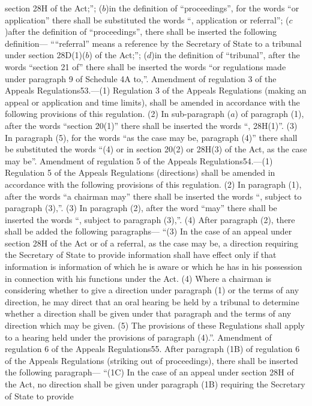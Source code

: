 \documentclass[a4paper]{article}
\begin{document}
section 28H of the Act;”;
($b$)in the definition of “proceedings”, for the words “or application” there
shall be substituted the words “, application or referral”;
($c$)after the definition of “proceedings”, there shall be inserted the following
definition—
““referral” means a reference by the Secretary of State to a tribunal under
section 28D(1)($b$) of the Act;”;
($d$)in the definition of “tribunal”, after the words “section 21 of” there shall
be inserted the words “or regulations made under paragraph 9 of Schedule 4A
to,”.
Amendment of regulation 3 of the Appeals Regulations53.—(1) Regulation 3 of the
Appeals Regulations (making an appeal or application and time limits), shall be
amended in accordance with the following provisions of this regulation.
(2) In sub-paragraph ($a$) of paragraph (1), after the words “section 20(1)” there
shall be inserted the words “, 28H(1)”.
(3) In paragraph (5), for the words “as the case may be, paragraph (4)” there
shall be substituted the words “(4) or in section 20(2) or 28H(3) of the Act, as
the case may be”.
Amendment of regulation 5 of the Appeals Regulations54.—(1) Regulation 5 of the
Appeals Regulations (directions) shall be amended in accordance with the
following provisions of this regulation.
(2) In paragraph (1), after the words “a chairman may” there shall be inserted
the words “, subject to paragraph (3),”.
(3) In paragraph (2), after the word “may” there shall be inserted the words “,
subject to paragraph (3),”.
(4) After paragraph (2), there shall be added the following paragraphs—
“(3) In the case of an appeal under section 28H of the Act or of a referral, as
the case may be, a direction requiring the Secretary of State to provide
information shall have effect only if that information is information of which
he is aware or which he has in his possession in connection with his functions
under the Act.
(4) Where a chairman is considering whether to give a direction under paragraph
(1) or the terms of any direction, he may direct that an oral hearing be held by
a tribunal to determine whether a direction shall be given under that paragraph
and the terms of any direction which may be given.
(5) The provisions of these Regulations shall apply to a hearing held under the
provisions of paragraph (4).”.
Amendment of regulation 6 of the Appeals Regulations55. After paragraph (1B) of
regulation 6 of the Appeals Regulations (striking out of proceedings), there
shall be inserted the following paragraph—
“(1C) In the case of an appeal under section 28H of the Act, no direction shall
be given under paragraph (1B) requiring the Secretary of State to provide
\end{document}
